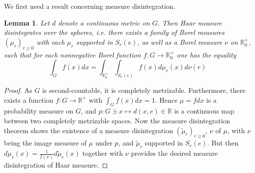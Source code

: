 \documentclass[12pt, reqno]{amsart}
\newtheorem{lemma}[theorem]{Lemma}
\newtheorem{remark}[theorem]{Remark}
\begin{document}
We first need a result concerning measure disintegration.
\begin{lemma}
    Let $d$ denote a continuous metric on $G$. Then Haar measure disintegrates over the spheres, i.e. there exists a family of Borel measures $(\mu_r)_{ r \ge 0}$ with each $\mu_r$ supported in $S_r(e)$, as well as a Borel measure $\nu$ on $\mathbb{R}_0^+$, such that for each nonnegative Borel function $f: G \to \mathbb{R}_0^+$ one has the equality 
    \[
    \int_G f(x) dx = \int_{\mathbb{R}_0^+} \int_{S_r(e)} f(x) d\mu_r(x) d\nu(r)  
    \]
\end{lemma}
\begin{proof}
   As $G$ is second-countable, it is completely metrizable. Furthermore, there exists a function $f: G \to \mathbb{R}^+$ with $\int_G f(x) dx = 1$. Hence $\mu = f dx$ is a probability measure on $G$, and $p: G \ni x \mapsto d(x,e) \in \mathbb{R}$ is a continuous map  between two completely metrizable spaces. 
   Now the measure disintegration theorem \cite[Theorem 5.3.1]{MR2401600} shows the existence of a measure disintegration $(\tilde{\mu}_r)_{ r \ge 0}$, $\nu$ of $\mu$, with $\nu$ being the image measure of $\mu$ under $p$, and $\tilde{\mu}_r$ supported in $S_r(e)$. But then $d\mu_r(x) = \frac{1}{f(x)} d\tilde{\mu}_r(x)$ together with $\nu$ provides the desired measure disintegration of Haar measure. 
\end{proof}


\end{document}
